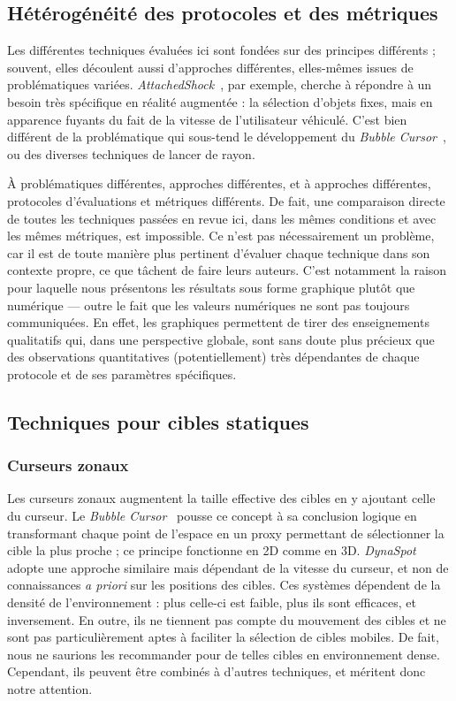     \subsection{Hétérogénéité des protocoles et des métriques}
    Les différentes techniques évaluées ici sont fondées sur des principes différents ; souvent, elles découlent aussi d'approches différentes, elles-mêmes issues de problématiques variées. \emph{AttachedShock}~\cite{you2012attachedshock, you2014attachedshock}, par exemple, cherche à répondre à un besoin très spécifique en réalité augmentée : la sélection d'objets fixes, mais en apparence \og fuyants \fg{} du fait de la vitesse de l'utilisateur véhiculé. C'est bien différent de la problématique qui sous-tend le développement du \emph{Bubble Cursor}~\cite{grossman2005bubble}, ou des diverses techniques de lancer de rayon.
    
    À problématiques différentes, approches différentes, et à approches différentes, protocoles d'évaluations et métriques différents. De fait, une comparaison directe de toutes les techniques passées en revue ici, dans les mêmes conditions et avec les mêmes métriques, est impossible. Ce n'est pas nécessairement un problème, car il est de toute manière plus pertinent d'évaluer chaque technique dans son contexte propre, ce que tâchent de faire leurs auteurs. C'est notamment la raison pour laquelle nous présentons les résultats sous forme graphique plutôt que numérique --- outre le fait que les valeurs numériques ne sont pas toujours communiquées. En effet, les graphiques permettent de tirer des enseignements qualitatifs qui, dans une perspective globale, sont sans doute plus précieux que des observations quantitatives (potentiellement) très dépendantes de chaque protocole et de ses paramètres spécifiques.
    
    \subsection{Techniques pour cibles statiques}
	\subsubsection{Curseurs zonaux}
    Les curseurs zonaux augmentent la taille effective des cibles en y ajoutant celle du curseur. Le \emph{Bubble Cursor}~\cite{grossman2005bubble} pousse ce concept à sa conclusion logique en transformant chaque point de l'espace en un proxy permettant de sélectionner la cible la plus proche ; ce principe fonctionne en 2D comme en 3D. \emph{DynaSpot}~\cite{chapuis2009dynaspot} adopte une approche similaire mais dépendant de la vitesse du curseur, et non de connaissances \emph{a priori} sur les positions des cibles. Ces systèmes dépendent de la densité de l'environnement : plus celle-ci est faible, plus ils sont efficaces, et inversement. En outre, ils ne tiennent pas compte du mouvement des cibles et ne sont pas particulièrement aptes à faciliter la sélection de cibles mobiles. De fait, nous ne saurions les recommander pour de telles cibles en environnement dense. Cependant, ils peuvent être combinés à d'autres techniques, et méritent donc notre attention.
    
